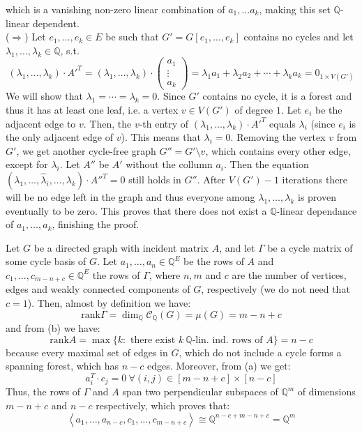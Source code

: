 \documentclass[12pt]{article}
\newenvironment{a_enum}{\begin{enumerate}[label=(\alph{*})]}{\end{enumerate}} %
\newcommand\rank{\mathrm{rank}}
\begin{document}
\begin{a_enum}
which is a vanishing non-zero linear combination of $a_1,\ldots a_k$, making this set $\mathbb{Q}$-linear dependent.\\
($\Rightarrow$) Let $e_1,\ldots,e_k\in E$ be such that $G'=G[e_1,\ldots,e_k]$ contains no cycles and let $\lambda_1,\ldots,\lambda_k\in\mathbb{Q}$, s.t.
$$(\lambda_1,\ldots,\lambda_k)\cdot A'^T=(\lambda_1,\ldots,\lambda_k)\cdot\left(\begin{array}{c}a_1\\\hline\vdots\\\hline a_k\end{array}\right)=\lambda_1a_1+\lambda_2a_2+\cdots+\lambda_ka_k=0_{1\times V(G')}$$
We will show that $\lambda_1=\cdots=\lambda_k=0$. Since $G'$ contains no cycle, it is a forest and thus it has at least one leaf, i.e. a vertex $v\in V(G')$ of degree $1$. Let $e_i$ be the adjacent edge to $v$. Then, the $v$-th entry of $(\lambda_1,\ldots,\lambda_k)\cdot A'^T$ equals $\lambda_i$ (since $e_i$ is the only adjacent edge of $v$). This means that $\lambda_i=0$. Removing the vertex $v$ from $G'$, we get another cycle-free graph $G''=G'\setminus v$, which contains every other edge, except for $\lambda_i$. Let $A''$ be $A'$ without the collumn $a_i$. Then the equation $(\lambda_1,\ldots,\hat{\lambda}_i,\ldots,\lambda_k)\cdot A''^T=0$ still holds in $G''$. After $V(G')-1$ iterations there will be no edge left in the graph and thus everyone among $\lambda_1,\ldots,\lambda_k$ is proven eventually to be zero. This proves that there does not exist a $\mathbb{Q}$-linear dependance of $a_1,\ldots,a_k$, finishing the proof.
\item Let $G$ be a directed graph with incident matrix $A$, and let $\Gamma$ be a cycle matrix of some cycle basis of $G$. Let $a_1,\ldots,a_n\in\mathbb{Q}^{E}$ be the rows of $A$ and $c_1,\ldots,c_{m-n+c}\in\mathbb{Q}^E$ the rows of $\Gamma$, where $n,m$ and $c$ are the number of vertices, edges and weakly connected components of $G$, respectively (we do not need that $c=1$). Then, almost by definition we have:
$$\rank\Gamma=\dim_{\mathbb{Q}}\mathcal{C}_{\mathbb{Q}}(G)=\mu(G)=m-n+c$$
and from (b) we have:
$$\rank A=\max\{k:\text{ there exist }k\ \mathbb{Q}\text{-lin. ind. rows of }A\}=n-c$$
because every maximal set of edges in $G$, which do not include a cycle forms a spanning forest, which has $n-c$ edges. Moreover, from (a) we get:
$$a_i^T\cdot c_j=0\ \forall(i,j)\in[m-n+c]\times[n-c]$$
Thus, the rows of $\Gamma$ and $A$ span two perpendicular subspaces of $\mathbb{Q}^m$ of dimensions $m-n+c$ and $n-c$ respectively, which proves that:
$$\left<a_1,\ldots,a_{n-c},c_1,\ldots,c_{m-n+c}\right>\cong\mathbb{Q}^{n-c+m-n+c}=\mathbb{Q}^m$$
\end{a_enum}
\end{document}
